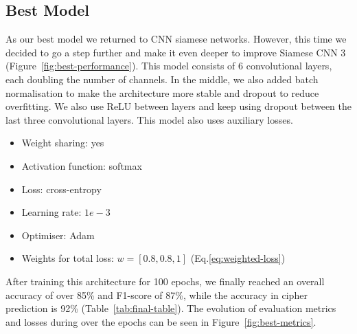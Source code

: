 \documentclass[10pt,conference,compsocconf]{IEEEtran}
\begin{document}
\subsection{Best Model}
As our best model we returned to CNN siamese networks. However, this time we decided to go a step further and make it even deeper to improve Siamese CNN 3 (Figure~\ref{fig:best-performance}). 
This model consists of 6 convolutional layers, each doubling the number of channels. In the middle, we also added batch normalisation to make the architecture more stable and dropout to reduce overfitting. We also use ReLU between layers and keep using dropout between the last three convolutional layers. This model also uses auxiliary losses.
\begin{itemize}
    \item Weight sharing: yes 
    \item Activation function: softmax
    \item Loss: cross-entropy
    \item Learning rate: $1e-3$
    \item Optimiser: Adam
    \item Weights for total loss: $w = [0.8, 0.8, 1]$ (Eq.\ref{eq:weighted-loss})
\end{itemize}

After training this architecture for 100 epochs, we finally reached an overall accuracy of over 85\% and F1-score of 87\%, while the accuracy in cipher prediction is 92\% (Table~\ref{tab:final-table}). The evolution of evaluation metrics and losses during over the epochs can be seen in Figure~\ref{fig:best-metrics}.

\end{document}
